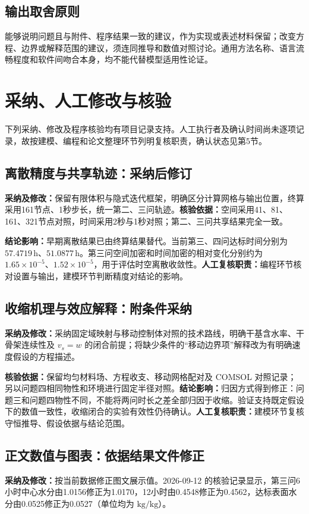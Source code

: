 \documentclass[UTF8,a4paper,12pt,fontset=windows]{ctexart}
\newcommand{\field}[1]{\textbf{#1：}}
\begin{document}
\subsection{输出取舍原则}
能够说明问题且与附件、程序结果一致的建议，作为实现或表述材料保留；改变方程、边界或解释范围的建议，须连同推导和数值对照讨论。通用方法名称、语言流畅程度和软件间吻合本身，均不能代替模型适用性论证。

\newpage
\section{采纳、人工修改与核验}
下列采纳、修改及程序核验均有项目记录支持。人工执行者及确认时间尚未逐项记录，故按建模、编程和论文整理环节列明复核职责，确认状态见第5节。

\subsection{离散精度与共享轨迹：采纳后修订}
\field{采纳及修改}保留有限体积与隐式迭代框架，明确区分计算网格与输出位置，终算采用161节点、1秒步长，统一第二、三问轨迹。\field{核验依据}空间采用41、81、161、321节点对照，时间采用2秒与1秒对照；第二、三问共享结果完全一致。

\field{结论影响}早期离散结果已由终算结果替代。当前第三、四问达标时间分别为 $57.4719\,\mathrm h$、$51.0877\,\mathrm h$。第三问空间加密和时间加密的相对变化分别约为 $1.65\times10^{-5}$、$1.52\times10^{-5}$，用于评估时空离散收敛性。\field{人工复核职责}编程环节核对设置与输出，建模环节判断精度对结论的影响。

\subsection{收缩机理与效应解释：附条件采纳}
\field{采纳及修改}采纳固定域映射与移动控制体对照的技术路线，明确干基含水率、干骨架连续性及 $v_s=w$ 的闭合前提；将缺少条件的“移动边界项”解释改为有明确速度假设的方程描述。

\field{核验依据}保留均匀材料场、方程收支、移动网格配对及 COMSOL 对照记录；另以问题四相同物性和环境进行固定半径对照。\field{结论影响}归因方式得到修正：问题三和问题四物性不同，不能将两问时长之差全部归因于收缩。验证支持既定假设下的数值一致性，收缩闭合的实验有效性仍待确认。\field{人工复核职责}建模环节复核守恒推导、假设依据与结论范围。

\subsection{正文数值与图表：依据结果文件修正}
\field{采纳及修改}按当前数据修正图文展示值。2026-09-12 的核验记录显示，第三问6小时中心水分由1.0156修正为1.0170，12小时由0.4548修正为0.4562，达标表面水分由0.0525修正为0.0527（单位均为 $\mathrm{kg/kg}$）。
\end{document}
